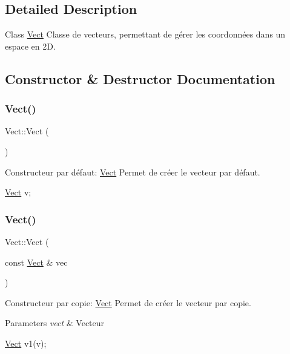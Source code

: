 \subsection{Detailed Description}
Class \hyperlink{classVect}{Vect} Classe de vecteurs, permettant de gérer les coordonnées dans un espace en 2D. 

\subsection{Constructor \& Destructor Documentation}
\mbox{\label{classVect_a1c153510458899146850b79a7277630b}} 
\subsubsection{\texorpdfstring{Vect()}{Vect()}\hspace{0.1cm}{\footnotesize\ttfamily [1/3]}}
{\footnotesize\ttfamily Vect\+::\+Vect (\begin{DoxyParamCaption}{ }\end{DoxyParamCaption})}



Constructeur par défaut\+: \hyperlink{classVect}{Vect} Permet de créer le vecteur par défaut. 


\begin{DoxyCode}
\hyperlink{classVect}{Vect} v;
\end{DoxyCode}
 \mbox{\label{classVect_af8a503f3e10b3ec27582e47fbbf3c66f}} 
\subsubsection{\texorpdfstring{Vect()}{Vect()}\hspace{0.1cm}{\footnotesize\ttfamily [2/3]}}
{\footnotesize\ttfamily Vect\+::\+Vect (\begin{DoxyParamCaption}\item[{const \hyperlink{classVect}{Vect} \&}]{vec }\end{DoxyParamCaption})}



Constructeur par copie\+: \hyperlink{classVect}{Vect} Permet de créer le vecteur par copie. 


\begin{DoxyParams}{Parameters}
{\em vect} & Vecteur 
\begin{DoxyCode}
\hyperlink{classVect}{Vect} v1(v);
\end{DoxyCode}
 \\
\hline
\end{DoxyParams}
\mbox{\label{classVect_a12b53ecc7a5ba733c85bacc1c6deac28}} 
